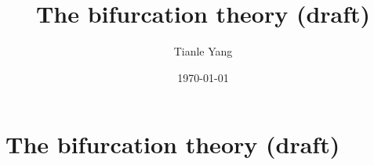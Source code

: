 \documentclass{noteformyself}
\title{The bifurcation theory (draft)}
\author{Tianle Yang}
\date{\today}
\begin{document}
    \maketitle

    \section{The bifurcation theory (draft)}

    

\end{document}
